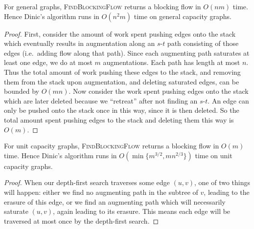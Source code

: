 \begin{lemma}
  For general graphs, \textsc{FindBlockingFlow} returns a blocking flow in $O(nm)$ time.
  Hence Dinic's algorithm runs in $O(n^2 m)$ time on general capacity graphs.
\end{lemma}
\begin{proof}
  First, consider the amount of work spent pushing edges onto the
  stack which eventually results in augmentation along an $s$-$t$ path
  consisting of those edges (i.e.\ adding flow along that path).
  Since each augmenting path saturates at least one edge,  we do at most $m$ augmentations. Each
  path has length at most $n$.
  Thus the total amount of work pushing these edges to the stack, and removing them
  from the stack upon augmentation, and deleting saturated edges, can
  be bounded by $O(mn)$.
  Now consider the work spent pushing edges onto the stack which are
  later deleted because we ``retreat'' after not finding an $s$-$t$.
  An edge can only be pushed onto the stack once in this way, since it
  is then deleted. So the total amount spent pushing edges to the
  stack and deleting them this way is $O(m)$.
\end{proof}
\begin{lemma}
  For unit capacity graphs, \textsc{FindBlockingFlow} returns a blocking flow in $O(m)$ time. Hence Dinic's
  algorithm runs in $O\left(\min\{m^{3/2}, mn^{2/3}\}\right)$ time on unit capacity graphs.
\end{lemma}
\begin{proof}
  When our depth-first search traverses some edge $(u, v)$, one of two things will happen: either we find no
  augmenting path in the subtree of $v$, leading to the erasure of this edge, or we find an augmenting path
  which will necessarily saturate $(u, v)$, again leading to its erasure. This means each edge will be
  traversed at most once by the depth-first search.
\end{proof}

